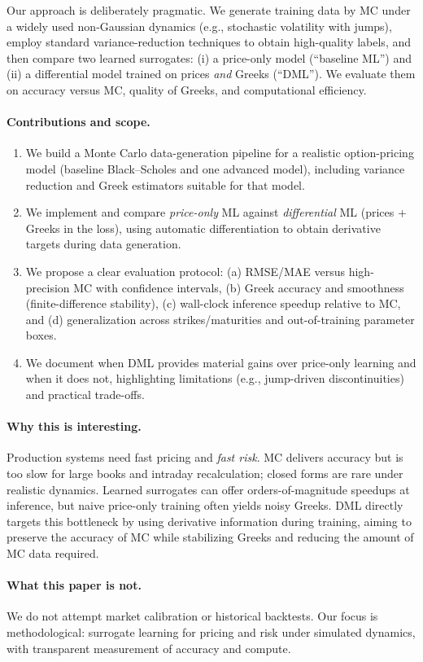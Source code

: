 Our approach is deliberately pragmatic. We generate training data by MC under a widely used non-Gaussian dynamics (e.g., stochastic volatility with jumps), employ standard variance-reduction techniques to obtain high-quality labels, and then compare two learned surrogates:
(i) a price-only model (``baseline ML'') and
(ii) a differential model trained on prices \emph{and} Greeks (``DML'').
We evaluate them on accuracy versus MC, quality of Greeks, and computational efficiency.

\paragraph{Contributions and scope.}
\begin{enumerate}
\item We build a Monte Carlo data-generation pipeline for a realistic option-pricing model (baseline Black--Scholes and one advanced model), including variance reduction and Greek estimators suitable for that model.
\item We implement and compare \emph{price-only} ML against \emph{differential} ML (prices + Greeks in the loss), using automatic differentiation to obtain derivative targets during data generation.
\item We propose a clear evaluation protocol: (a) RMSE/MAE versus high-precision MC with confidence intervals, (b) Greek accuracy and smoothness (finite-difference stability), (c) wall-clock inference speedup relative to MC, and (d) generalization across strikes/maturities and out-of-training parameter boxes.
\item We document when DML provides material gains over price-only learning and when it does not, highlighting limitations (e.g., jump-driven discontinuities) and practical trade-offs.
\end{enumerate}

\paragraph{Why this is interesting.}
Production systems need fast pricing and \emph{fast risk}. MC delivers accuracy but is too slow for large books and intraday recalculation; closed forms are rare under realistic dynamics. Learned surrogates can offer orders-of-magnitude speedups at inference, but naive price-only training often yields noisy Greeks. DML directly targets this bottleneck by using derivative information during training, aiming to preserve the accuracy of MC while stabilizing Greeks and reducing the amount of MC data required.

\paragraph{What this paper is not.}
We do not attempt market calibration or historical backtests. Our focus is methodological: surrogate learning for pricing and risk under simulated dynamics, with transparent measurement of accuracy and compute.